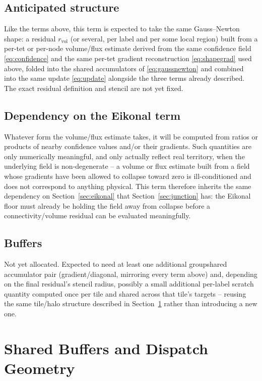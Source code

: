 \documentclass[11pt]{article}
\begin{document}
\subsection{Anticipated structure}

Like the terms above, this term is expected to take the same Gauss--Newton
shape: a residual $r_{\text{vol}}$ (or several, per label and per some
local region) built from a per-tet or per-node volume/flux estimate
derived from the same confidence field \eqref{eq:confidence} and the same
per-tet gradient reconstruction \eqref{eq:shapegrad} used above, folded
into the shared accumulators of \eqref{eq:gaussnewton} and combined into
the same update \eqref{eq:update} alongside the three terms already
described. The exact residual definition and stencil are not yet fixed.

\subsection{Dependency on the Eikonal term}

Whatever form the volume/flux estimate takes, it will be computed from
ratios or products of nearby confidence values and/or their gradients. Such
quantities are only numerically meaningful, and only actually reflect real
territory, when the underlying field is non-degenerate -- a volume or flux
estimate built from a field whose gradients have been allowed to collapse
toward zero is ill-conditioned and does not correspond to anything
physical. This term therefore inherits the same dependency on
Section~\ref{sec:eikonal} that Section~\ref{sec:junction} has: the Eikonal
floor must already be holding the field away from collapse before a
connectivity/volume residual can be evaluated meaningfully.

\subsection{Buffers}

Not yet allocated. Expected to need at least one additional groupshared
accumulator pair (gradient/diagonal, mirroring every term above) and,
depending on the final residual's stencil radius, possibly a small
additional per-label scratch quantity computed once per tile and shared
across that tile's targets -- reusing the same tile/halo structure
described in Section~\ref{sec:buffers} rather than introducing a new one.

\section{Shared Buffers and Dispatch Geometry}
\label{sec:buffers}
\end{document}

